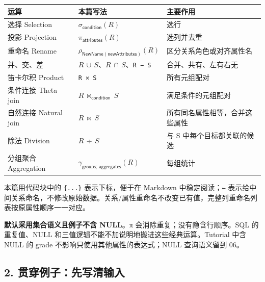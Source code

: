 \begin{longtable}[]{@{}
  >{\raggedright\arraybackslash}p{}
  >{\raggedright\arraybackslash}p{}
  >{\raggedright\arraybackslash}p{}@{}}
\toprule\noalign{}
\begin{minipage}[b]{\linewidth}\raggedright
运算
\end{minipage} & \begin{minipage}[b]{\linewidth}\raggedright
本篇写法
\end{minipage} & \begin{minipage}[b]{\linewidth}\raggedright
主要作用
\end{minipage} \\
\midrule\noalign{}
\endhead
\bottomrule\noalign{}
\endlastfoot
选择 Selection & \(\sigma _{\mathsf{condition}}(R)\) & 选行 \\
投影 Projection & \(\pi _{\mathsf{attributes}}(R)\) & 选列并去重 \\
重命名 Rename & \(\rho _{\mathsf{NewName}(\mathsf{newAttributes})}(R)\) & 区分关系角色或对齐属性名 \\
并、交、差 & \(R\,\cup \,S\)、\(R\,\cap \,S\)、\texttt{R\ −\ S} & 合并、共有、左有右无 \\
笛卡尔积 Product & \texttt{R\ ×\ S} & 所有元组配对 \\
条件连接 Theta join & \(R\,\bowtie _{\mathsf{condition}}\,S\) & 满足条件的元组配对 \\
自然连接 Natural join & \(R\,\bowtie \,S\) & 所有同名属性相等，合并这些属性 \\
除法 Division & \(R\,\div \,S\) & 与 S 中每个目标都关联的候选 \\
分组聚合 Aggregation & \(\gamma _{\mathsf{groups};\,\mathsf{aggregates}}(R)\) & 每组统计 \\
\end{longtable}

本篇用代码块中的 \texttt{\{...\}} 表示下标，便于在 Markdown 中稳定阅读；\texttt{←} 表示给中间关系命名，不修改原始数据。关系/属性重命名不改变已有值，完整列重命名列表按原属性顺序一一对应。

\textbf{默认采用集合语义且例子不含 NULL}。π 会消除重复；没有隐含行顺序。SQL 的重复值、NULL 和三值逻辑不能不加说明地搬进这些经典运算。Tutorial 中含 NULL 的 grade 不影响只使用其他属性的表达式；NULL 查询语义留到 06。

\subsection{2. 贯穿例子：先写清输入}\label{05_relational_algebra_zh-ux8d2fux7a7fux4f8bux5b50ux5148ux5199ux6e05ux8f93ux5165}

